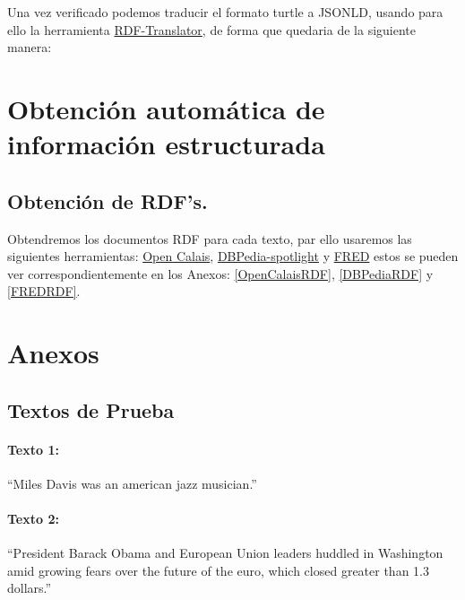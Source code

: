 \documentclass[spanish]{llncs}   %
\begin{document}
Una vez verificado podemos traducir el formato turtle a JSONLD, usando para ello la herramienta \href{https://rdf-translator.appspot.com}{RDF-Translator}, de forma que quedaria de la siguiente manera:




\section{Obtención automática de información estructurada}

\subsection{Obtención de RDF's.}

Obtendremos los documentos RDF para cada texto, par ello usaremos las siguientes herramientas: 
\href{https://www.refinitiv.com/en/products/intelligent-tagging-text-analytics}{Open Calais}, 
\href{https://www.dbpedia-spotlight.org/demo/}{DBPedia-spotlight} y 
\href{http://wit.istc.cnr.it/stlab-tools/fred/demo/?}{FRED} 
estos se pueden ver correspondientemente en los Anexos: \ref{OpenCalaisRDF}, \ref{DBPediaRDF} y \ref{FREDRDF}.



\section{Anexos}

\subsection{Textos de Prueba}\label{Textos}

\paragraph{Texto 1:}
“Miles Davis was an american jazz musician.”

\paragraph{Texto 2:}
“President Barack Obama and European Union leaders huddled in Washington amid growing fears over the future of the euro, which closed greater than 1.3 dollars.”
\end{document}
